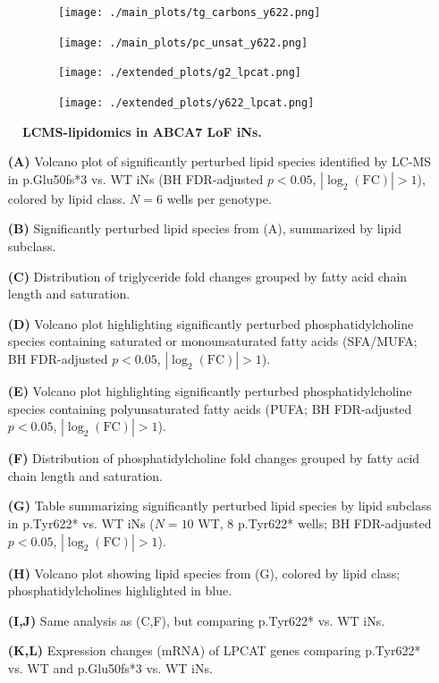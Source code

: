 \begin{figure}[H]
\begin{subfigure}[t]{.3\textwidth}
        \caption{}
        \texttt{[image: ./main\_plots/tg\_carbons\_y622.png]}        
    \end{subfigure} 
    \begin{subfigure}[t]{.3\textwidth}
        \caption{}
        \texttt{[image: ./main\_plots/pc\_unsat\_y622.png]}        
    \end{subfigure} 
    \begin{subfigure}[t]{.2\textwidth}
        \caption{}
        \texttt{[image: ./extended\_plots/g2\_lpcat.png]}        
    \end{subfigure} 
    \begin{subfigure}[t]{.2\textwidth}
        \caption{}
        \texttt{[image: ./extended\_plots/y622\_lpcat.png]}        
    \end{subfigure} 
    \caption{
        \textbf{LCMS-lipidomics in ABCA7 LoF iNs.}\\
    }
    \label{fig:main_lipids}
\end{figure}
\begin{itemize}
    \item[\textbf{(A)}] Volcano plot of significantly perturbed lipid species identified by LC-MS in p.Glu50fs*3 vs. WT iNs (BH FDR-adjusted $p<0.05$, $|\log_2(\text{FC})|>1$), colored by lipid class. $N=6$ wells per genotype.
    \item[\textbf{(B)}] Significantly perturbed lipid species from (A), summarized by lipid subclass.
    \item[\textbf{(C)}] Distribution of triglyceride fold changes grouped by fatty acid chain length and saturation.
    \item[\textbf{(D)}] Volcano plot highlighting significantly perturbed phosphatidylcholine species containing saturated or monounsaturated fatty acids (SFA/MUFA; BH FDR-adjusted $p<0.05$, $|\log_2(\text{FC})|>1$).
    \item[\textbf{(E)}] Volcano plot highlighting significantly perturbed phosphatidylcholine species containing polyunsaturated fatty acids (PUFA; BH FDR-adjusted $p<0.05$, $|\log_2(\text{FC})|>1$).
    \item[\textbf{(F)}] Distribution of phosphatidylcholine fold changes grouped by fatty acid chain length and saturation.
    \item[\textbf{(G)}] Table summarizing significantly perturbed lipid species by lipid subclass in p.Tyr622* vs. WT iNs ($N=10$ WT, $8$ p.Tyr622* wells; BH FDR-adjusted $p<0.05$, $|\log_2(\text{FC})|>1$).
    \item[\textbf{(H)}] Volcano plot showing lipid species from (G), colored by lipid class; phosphatidylcholines highlighted in blue.
    \item[\textbf{(I,J)}] Same analysis as (C,F), but comparing p.Tyr622* vs. WT iNs.
    \item[\textbf{(K,L)}] Expression changes (mRNA) of LPCAT genes comparing p.Tyr622* vs. WT and p.Glu50fs*3 vs. WT iNs.
\end{itemize}